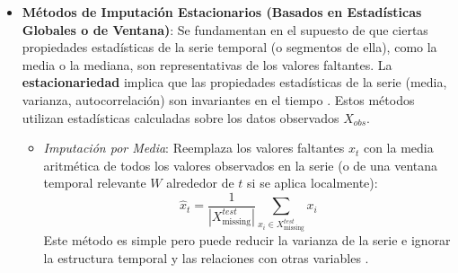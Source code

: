 \begin{itemize}
\begin{itemize}
            donde $t_1 = \min\{\tau \in \{1, \dots, T\} \mid \tau > t \text{ y } x_\tau \ne \text{NaN}\}$.
            
            Utilizado cuando se espera que el futuro inmediato influya en el valor actual \citep{Allison2001missing}.

            \item \textit{Interpolación Lineal}: Si $x_t$ es faltante y se encuentra entre dos valores observados $x_{t_a}$ (anterior, $t_a < t$) y $x_{t_p}$ (posterior, $t_p > t$), con todos los valores entre $x_{t_a}$ y $x_{t_p}$ (excluyendo $x_t$) también faltantes o siendo estos los más cercanos observados, se asume una trayectoria lineal. El valor imputado $\hat{x}_t$ se calcula como:
            \begin{equation}
            \hat{x}_t = x_{t_a} + (x_{t_p} - x_{t_a}) \frac{t - t_a}{t_p - t_a}
            \label{eq:linear_interpolation}
            \end{equation}
            Este método es una mejora sobre LOCF/NOCB si hay fluctuaciones entre los puntos conocidos \citep{Hastie2009}. Para huecos al inicio o final de la serie, se puede recurrir a extrapolación o a LOCF/NOCB.
        \end{itemize}
        Estos métodos son generalmente eficientes para rellenar huecos cortos, pero su rendimiento puede decaer ante lagunas de datos más extensas o patrones no lineales.

    \item \textbf{Métodos de Imputación Estacionarios (Basados en Estadísticas Globales o de Ventana)}:
    Se fundamentan en el supuesto de que ciertas propiedades estadísticas de la serie temporal (o segmentos de ella), como la media o la mediana, son representativas de los valores faltantes. La \textbf{estacionariedad} implica que las propiedades estadísticas de la serie (media, varianza, autocorrelación) son invariantes en el tiempo \citep{Box2015time}. Estos métodos utilizan estadísticas calculadas sobre los datos observados $X_{obs}$.

        \begin{itemize}
            \item \textit{Imputación por Media}: Reemplaza los valores faltantes $x_t$ con la media aritmética de todos los valores observados en la serie (o de una ventana temporal relevante $W$ alrededor de $t$ si se aplica localmente):
            \begin{equation}
            \hat{x}_t = \frac{1}{|X_{\text{missing}}^{test}|} \sum_{x_i \in X_{\text{missing}}^{test} } x_i
            \end{equation}
            Este método es simple pero puede reducir la varianza de la serie e ignorar la estructura temporal y las relaciones con otras variables \citep{Donders2006review}.


\end{itemize}
\end{itemize}
